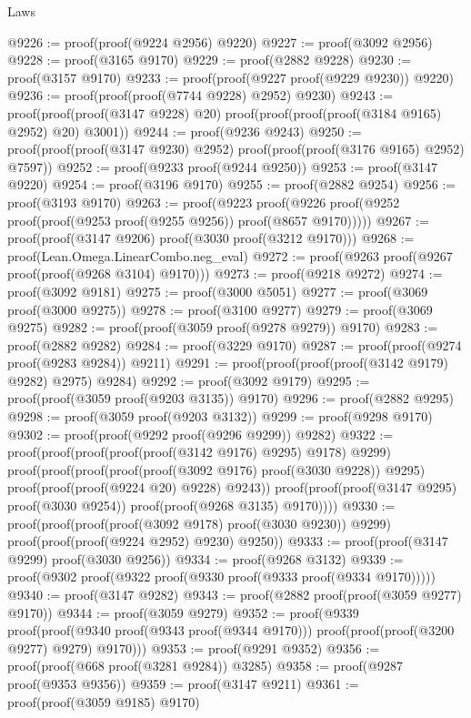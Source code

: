 \begin{lexlean}{Laws}
\begin{coremodule}
@9226 := proof(proof(@9224 @2956) @9220)
@9227 := proof(@3092 @2956)
@9228 := proof(@3165 @9170)
@9229 := proof(@2882 @9228)
@9230 := proof(@3157 @9170)
@9233 := proof(proof(@9227 proof(@9229 @9230)) @9220)
@9236 := proof(proof(proof(@7744 @9228) @2952) @9230)
@9243 := proof(proof(proof(@3147 @9228) @20)
      proof(proof(proof(proof(@3184 @9165) @2952) @20) @3001))
@9244 := proof(@9236 @9243)
@9250 := proof(proof(proof(@3147 @9230) @2952) proof(proof(proof(@3176 @9165) @2952) @7597))
@9252 := proof(@9233 proof(@9244 @9250))
@9253 := proof(@3147 @9220)
@9254 := proof(@3196 @9170)
@9255 := proof(@2882 @9254)
@9256 := proof(@3193 @9170)
@9263 := proof(@9223
      proof(@9226 proof(@9252 proof(proof(@9253 proof(@9255 @9256)) proof(@8657 @9170)))))
@9267 := proof(proof(@3147 @9206) proof(@3030 proof(@3212 @9170)))
@9268 := proof(Lean.Omega.LinearCombo.neg_eval)
@9272 := proof(@9263 proof(@9267 proof(proof(@9268 @3104) @9170)))
@9273 := proof(@9218 @9272)
@9274 := proof(@3092 @9181)
@9275 := proof(@3000 @5051)
@9277 := proof(@3069 proof(@3000 @9275))
@9278 := proof(@3100 @9277)
@9279 := proof(@3069 @9275)
@9282 := proof(proof(@3059 proof(@9278 @9279)) @9170)
@9283 := proof(@2882 @9282)
@9284 := proof(@3229 @9170)
@9287 := proof(proof(@9274 proof(@9283 @9284)) @9211)
@9291 := proof(proof(proof(proof(@3142 @9179) @9282) @2975) @9284)
@9292 := proof(@3092 @9179)
@9295 := proof(proof(@3059 proof(@9203 @3135)) @9170)
@9296 := proof(@2882 @9295)
@9298 := proof(@3059 proof(@9203 @3132))
@9299 := proof(@9298 @9170)
@9302 := proof(proof(@9292 proof(@9296 @9299)) @9282)
@9322 := proof(proof(proof(proof(proof(@3142 @9176) @9295) @9178) @9299)
      proof(proof(proof(proof(proof(@3092 @9176) proof(@3030 @9228)) @9295)
            proof(proof(proof(@9224 @20) @9228) @9243))
          proof(proof(proof(@3147 @9295) proof(@3030 @9254)) proof(proof(@9268 @3135) @9170))))
@9330 := proof(proof(proof(proof(@3092 @9178) proof(@3030 @9230)) @9299)
      proof(proof(proof(@9224 @2952) @9230) @9250))
@9333 := proof(proof(@3147 @9299) proof(@3030 @9256))
@9334 := proof(@9268 @3132)
@9339 := proof(@9302 proof(@9322 proof(@9330 proof(@9333 proof(@9334 @9170)))))
@9340 := proof(@3147 @9282)
@9343 := proof(@2882 proof(proof(@3059 @9277) @9170))
@9344 := proof(@3059 @9279)
@9352 := proof(@9339
      proof(proof(@9340 proof(@9343 proof(@9344 @9170)))
          proof(proof(proof(@3200 @9277) @9279) @9170)))
@9353 := proof(@9291 @9352)
@9356 := proof(proof(@668 proof(@3281 @9284)) @3285)
@9358 := proof(@9287 proof(@9353 @9356))
@9359 := proof(@3147 @9211)
@9361 := proof(proof(@3059 @9185) @9170)

\end{coremodule}
\end{lexlean}

